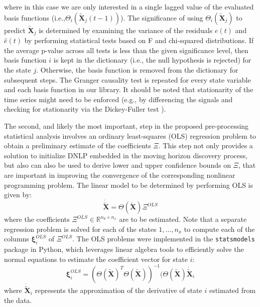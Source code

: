 \documentclass[12pt]{article}
\begin{document}
where in this case we are only interested in a single lagged value of the evaluated basis functions (i.e.,$\Theta_i(\tilde{\textbf{X}}_j(t-1))$). The significance of using $\Theta_i(\tilde{\textbf{X}}_j)$ to predict ${\tilde{\textbf{X}}}_j$ is determined by examining the variance of the residuals $e(t)$ and $\hat{e}(t)$ by performing statistical tests based on F and chi-squared distributions. If the average p-value across all tests is less than the given significance level, then basis function $i$ is kept in the dictionary (i.e., the null hypothesis is rejected) for the state $j$. Otherwise, the basis function is removed from the dictionary for subsequent steps. The Granger causality test is repeated for every state variable and each basis function in our library. It should be noted that stationarity of the time series might need to be enforced (e.g., by differencing the signals and checking for stationarity via the Dickey-Fuller test \cite{dickey1979distribution}).

The second, and likely the most important, step in the proposed pre-processing statistical analysis involves an ordinary least-squares (OLS) regression problem to obtain a preliminary estimate of the coefficients $\Xi$. This step not only provides a solution to initialize DNLP embedded in the moving horizon discovery process, but also can also be used to derive lower and upper confidence bounds on $\Xi$, that are important in improving the convergence of the corresponding nonlinear programming problem. The linear model to be determined by performing OLS is given by:
\begin{equation}
\label{eq:OLS_preprocessing}
\dot{\tilde{\textbf{X}}} = \Theta(\tilde{\textbf{X}})\Xi^{OLS}
\end{equation}
where the coefficients $\Xi^{OLS} \in \mathbb{R}^{n_\theta \times n_x}$ are to be estimated. Note that a separate regression problem is solved for each of the states $1,\dots, n_x$ to compute each of the columns $\pmb{\xi}_i^{OLS}$ of $\Xi^{OLS}$. The OLS problems were implemented in the \verb"statsmodels" package \cite{seabold2010statsmodels} in Python, which leverages linear algebra tools to efficiently solve  the normal equations to estimate the coefficient vector for state $i$:
\begin{equation}
\label{eq:normal_eq}
\pmb{\xi}_i^{OLS} = (\Theta(\tilde{\textbf{X}})^T\Theta(\tilde{\textbf{X}}))^{-1}(\Theta(\tilde{\textbf{X}})\dot{\tilde{\textbf{X}}}_i
\end{equation}
where $\dot{\tilde{\textbf{X}}}_i$ represents the  approximation of the derivative of state $i$ estimated from the data.
\end{document}
